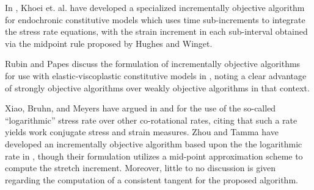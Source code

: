 In \cite{Khoei2003}, Khoei et. al. have developed a specialized incrementally objective algorithm for endochronic constitutive models which uses time sub-increments to integrate the stress rate equations, with the strain increment in each sub-interval obtained via the midpoint rule proposed by Hughes and Winget.

Rubin and Papes discuss the formulation of incrementally objective algorithms for use with elastic-viscoplastic constitutive models in \cite{rubin2011}, noting a clear advantage of strongly objective algorithms over weakly objective algorithms in that context.

Xiao, Bruhn, and Meyers have argued in \cite{xiao1997} and \cite{xiao1998} for the use of the so-called ``logarithmic'' stress rate over other co-rotational rates, citing that such a rate yields work conjugate stress and strain measures. Zhou and Tamma have developed an incrementally objective algorithm based upon the the logarithmic rate in \cite{zhou2003}, though their formulation utilizes a mid-point approximation scheme to compute the stretch increment. Moreover, little to no discussion is given regarding the computation of a consistent tangent for the proposed algorithm.

